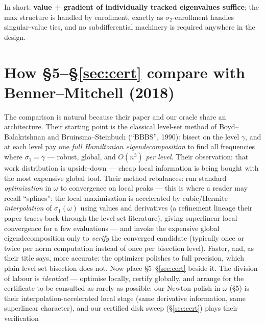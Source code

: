 \documentclass[11pt,a4paper]{article}
\begin{document}
{In short: \textbf{value + gradient of individually tracked eigenvalues suffice}; the max
structure is handled by enrollment, exactly as $\sigma_2$-enrollment handles
singular-value ties, and no subdifferential machinery is required anywhere in the design.

\section{How \S5--\S\ref{sec:cert} compare with Benner--Mitchell (2018)}
\label{sec:bm}


The comparison is natural because their paper and our oracle share an architecture.  Their starting point is the classical level-set method of
Boyd--Balakrishnan and Bruinsma--Steinbuch (``BBBS'', 1990): bisect on the level
$\gamma$, and at each level pay one \emph{full Hamiltonian eigendecomposition} to find
all frequencies where $\sigma_1=\gamma$ --- robust, global, and $O(n^3)$ \emph{per
level}.  Their observation: that work distribution is upside-down --- cheap local
information is being bought with the most expensive global tool.  Their method
rebalances: run standard \emph{optimization} in $\omega$ to convergence on local peaks
--- this is where a reader may recall ``splines'': the local maximisation is
accelerated by cubic/Hermite \emph{interpolation} of $\sigma_1(\omega)$ using values
and derivatives (a refinement lineage their paper traces back through the level-set
literature), giving superlinear local convergence for a few evaluations --- and invoke
the expensive global eigendecomposition only to \emph{verify} the converged candidate
(typically once or twice per norm computation instead of once per bisection level).
Faster, and, as their title says, more accurate: the optimizer polishes to full
precision, which plain level-set bisection does not.
Now place \S5--\S\ref{sec:cert} beside it.  The division of labour is
\emph{identical} --- optimise locally, certify globally, and arrange for the certificate
to be consulted as rarely as possible: our Newton polish in $\omega$ (\S5) is their
interpolation-accelerated local stage (same derivative information, same superlinear
character), and our certified disk sweep (\S\ref{sec:cert}) plays their verification

}
\end{document}
